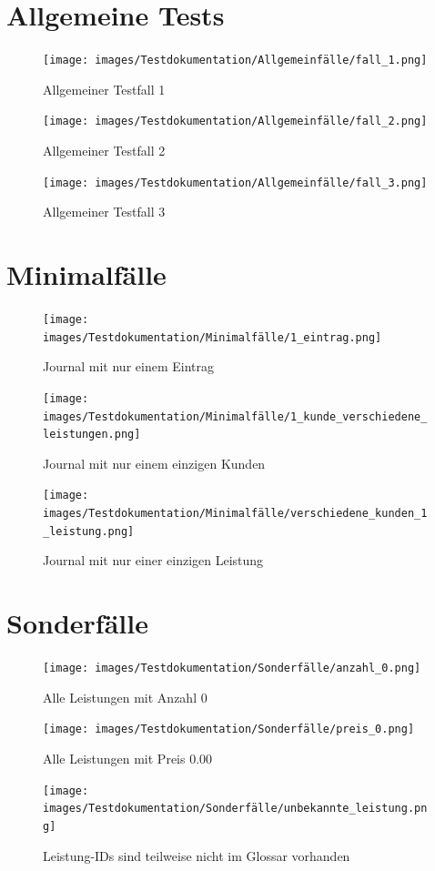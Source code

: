 \section{Allgemeine Tests}\label{sec:allgemeine-tests}
\begin{figure}[!h]
    \centering
    \texttt{[image: images/Testdokumentation/Allgemeinfälle/fall\_1.png]}
    \caption{Allgemeiner Testfall 1}
\end{figure}

\begin{figure}[!h]
    \centering
    \texttt{[image: images/Testdokumentation/Allgemeinfälle/fall\_2.png]}
    \caption{Allgemeiner Testfall 2}
\end{figure}

\begin{figure}[!h]
    \centering
    \texttt{[image: images/Testdokumentation/Allgemeinfälle/fall\_3.png]}
    \caption{Allgemeiner Testfall 3}
\end{figure}

\section{Minimalfälle}\label{sec:minimalfaelle}
\begin{figure}[!h]
    \centering
    \texttt{[image: images/Testdokumentation/Minimalfälle/1\_eintrag.png]}
    \caption{Journal mit nur einem Eintrag}
\end{figure}

\begin{figure}[!h]
    \centering
    \texttt{[image: images/Testdokumentation/Minimalfälle/1\_kunde\_verschiedene\_leistungen.png]}
    \caption{Journal mit nur einem einzigen Kunden}
\end{figure}

\begin{figure}[!h]
    \centering
    \texttt{[image: images/Testdokumentation/Minimalfälle/verschiedene\_kunden\_1\_leistung.png]}
    \caption{Journal mit nur einer einzigen Leistung}
\end{figure}

\section{Sonderfälle}\label{sec:minimalfaelle}

\begin{figure}[!h]
    \centering
    \texttt{[image: images/Testdokumentation/Sonderfälle/anzahl\_0.png]}
    \caption{Alle Leistungen mit Anzahl 0}
\end{figure}

\begin{figure}[!h]
    \centering
    \texttt{[image: images/Testdokumentation/Sonderfälle/preis\_0.png]}
    \caption{Alle Leistungen mit Preis 0.00}
\end{figure}

\begin{figure}[!h]
    \centering
    \texttt{[image: images/Testdokumentation/Sonderfälle/unbekannte\_leistung.png]}
    \caption{Leistung-IDs sind teilweise nicht im Glossar vorhanden}
\end{figure}